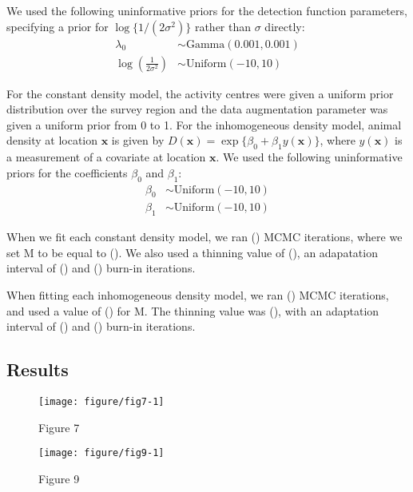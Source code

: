 \documentclass[10pt,a4paper]{article}\usepackage[]{graphicx}\usepackage[]{color}
\makeatletter
\def\maxwidth{ %
  \ifdim\Gin@nat@width>\linewidth
    \linewidth
  \else
    \Gin@nat@width
  \fi
}
\newenvironment{knitrout}{}{} %
\makeatother
\begin{document}
We used the following uninformative priors for the detection function
parameters, specifying a prior for $\log\{1/(2\sigma^2)\}$ rather than
$\sigma$ directly:
\begin{align*}
  \lambda_0 &\sim \text{Gamma}(0.001, 0.001) \\ 
  \log\left(\frac{1}{2\sigma^2}\right) &\sim \text{Uniform}(-10, 10)
\end{align*}

For the constant density model, the activity centres were given a
uniform prior distribution over the survey region and the data
augmentation parameter was given a uniform prior from 0 to 1. For the
inhomogeneous density model, animal density at location $\bm{x}$ is
given by $D(\bm{x}) = \exp\{\beta_0 + \beta_1 y(\bm{x})\}$, where
$y(\bm{x})$ is a measurement of a covariate at location $\bm{x}$. We
used the following uninformative priors for the coefficients $\beta_0$
and $\beta_1$:
\begin{align*}
\beta_0 &\sim \text{Uniform}(-10, 10) \\
\beta_1 &\sim \text{Uniform}(-10, 10)
\end{align*}

When we fit each constant density model, we ran () MCMC iterations,
where we set M to be equal to (). We also used a thinning value of (),
an adapatation interval of () and () burn-in iterations.

When fitting each inhomogeneous density model, we ran () MCMC iterations,
and used a value of () for M. The thinning value was (), with an adaptation
interval of () and () burn-in iterations.

\subsection{Results}
\label{sec:appendix-results}

\begin{knitrout}
\color{fgcolor}\begin{figure}
\texttt{[image: figure/fig7-1]} \caption[Figure 7]{Figure 7}\label{fig:fig7}
\end{figure}

\end{knitrout}

\begin{knitrout}
\color{fgcolor}\begin{figure}
\texttt{[image: figure/fig9-1]} \caption[Figure 9]{Figure 9}\label{fig:fig9}
\end{figure}

\end{knitrout}
\end{document}
